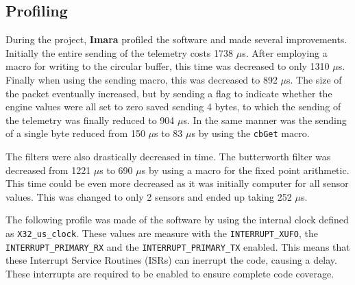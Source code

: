 \documentclass{article}
\begin{document}
\subsection{Profiling}
During the project, \textbf{Imara} profiled the software and made several improvements. Initially the entire sending of the telemetry costs 1738 $\mu$s. After employing a macro for writing to the circular buffer, this time was decreased to only 1310 $\mu$s. Finally when using the sending macro, this was decreased to 892 $\mu$s. The size of the packet eventually increased, but by sending a flag to indicate whether the engine values were all set to zero saved sending 4 bytes, to which the sending of the telemetry was finally reduced to 904 $\mu$s. In the same manner was the sending of a single byte reduced from 150 $\mu$s to 83 $\mu$s by using the \texttt{cbGet} macro. 

The filters were also drastically decreased in time. The butterworth filter was decreased from 1221 $\mu$s to 690 $\mu$s by using a macro for the fixed point arithmetic. This time could be even more decreased as it was initially computer for all sensor values. This was changed to only 2 sensors and ended up taking 252 $\mu$s.

The following profile was made of the software by using the internal clock defined as \texttt{X32\_us\_clock}. These values are measure with the \texttt{INTERRUPT\_XUFO}, the \texttt{INTERRUPT\_PRIMARY\_RX} and the \texttt{INTERRUPT\_PRIMARY\_TX} enabled. This means that these Interrupt Service Routines (ISRs) can inerrupt the code, causing a delay. These interrupts are required to be enabled to ensure complete code coverage.
\end{document}
